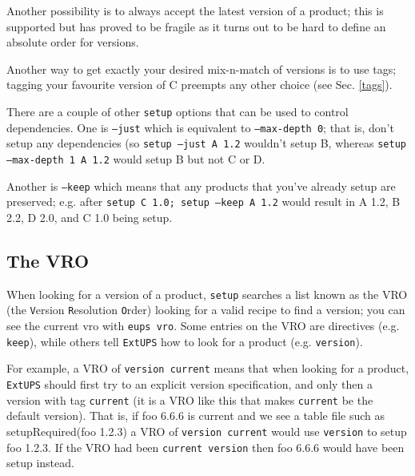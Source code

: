 \documentclass{article}
\newcommand{\code}[1]{\texttt{#1}}
\newcommand{\eups}{\code{ExtUPS}\xspace}
\let\overbatim=\verbatim
\let\oendverbatim=\endverbatim
\renewenvironment{verbatim}
{\center\minipage{16cm}\overbatim}
{\oendverbatim\endminipage\endcenter}
\begin{document}
Another possibility is to always accept the latest version of a product; this is
supported but has proved to be fragile as it turns out to be hard to define an absolute order for versions.

Another way to get exactly your desired mix-n-match of versions is to use tags; tagging your favourite
version of C preempts any other choice (see Sec. \ref{tags}).

There are a couple of other \code{setup} options that can be used to control dependencies.  One is
\code{--just} which is equivalent to \code{--max-depth 0}; that is, don't setup any dependencies (so
\code{setup --just A 1.2} wouldn't setup B, whereas
\code{setup --max-depth 1 A 1.2} would setup B but not C or D.

Another is \code{--keep} which means that any products that you've already setup are preserved; e.g.
after \code{setup C 1.0; setup --keep A 1.2} would
result in A 1.2, B 2.2, D 2.0, and C 1.0 being setup.

\subsection{The VRO}
\label{VRO}

When looking for a version of a product, \code{setup} searches a list known as the VRO (the \code{V}ersion
\code{R}esolution \code{O}rder) looking for a valid recipe to find a version; you can see the current vro with
\code{eups vro}.  Some entries on the VRO are directives (e.g.  \code{keep}), while others tell \eups how to
look for a product (e.g. \code{version}).

For example, a VRO of \code{version current} means that when looking for a product, \eups should
first try to an explicit version specification, and only then a version with tag \code{current} (it
is a VRO like this that makes \code{current} be the default version).  That is,
if foo 6.6.6 is current and we see a table file such as
\begin{verbatim}
setupRequired(foo 1.2.3)
\end{verbatim}
a VRO of \code{version current} would use  \code{version} to setup foo 1.2.3.
If the VRO had been \code{current version} then foo 6.6.6 would have been setup instead.
\end{document}
